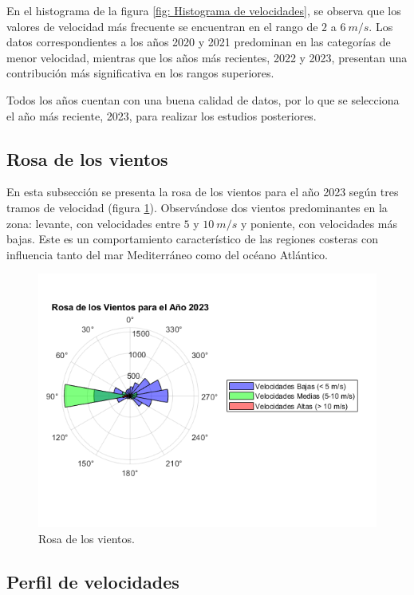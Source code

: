 \documentclass{IEEEtran}
\begin{document}
En el histograma de la figura \ref{fig: Histograma de velocidades}, se observa que los valores de velocidad más frecuente se encuentran en el rango de $2$ a $6\ m/s$. Los datos correspondientes a los años 2020 y 2021 predominan en las categorías de menor velocidad, mientras que los años más recientes, 2022 y 2023, presentan una contribución más significativa en los rangos superiores.

Todos los años cuentan con una buena calidad de datos, por lo que se selecciona el año más reciente, 2023, para realizar los estudios posteriores.

\subsection{Rosa de los vientos}

En esta subsección se presenta la rosa de los vientos para el año 2023 según tres tramos de velocidad (figura \ref{fig: Rosa de los vientos}). Observándose dos vientos predominantes en la zona: levante, con velocidades entre $5$ y $10\ m/s$  y poniente, con velocidades más bajas. Este es un comportamiento característico de las regiones costeras con influencia tanto del mar Mediterráneo como del océano Atlántico.

\begin{figure}[h]
    \centering
    \includegraphics[width = 0.5 \textwidth]{Imagenes/Rosa de los Vientos.png}
    \caption{Rosa de los vientos.}
    \label{fig: Rosa de los vientos}
\end{figure}

\subsection{Perfil de velocidades}
\end{document}
